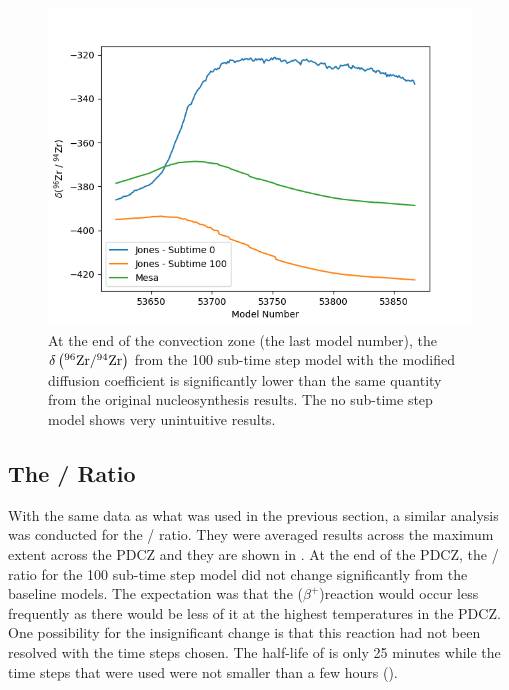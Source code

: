 \documentclass[fleqn,usenatbib]{mnras}
\begin{document}
\begin{figure}
   \includegraphics[width=1\columnwidth]{figs/JonesS1_zr.png}
   \caption{At the end of the convection zone (the last model number), the $\delta\left(\zirconium[96] / \zirconium[94]\right)$ from the 100 sub-time step model with the modified diffusion coefficient is significantly lower than the same quantity from the original nucleosynthesis results. The no sub-time step model shows very unintuitive results.}
\end{figure}

\subsection{The \xenon[128] / \xenon[130] Ratio}

With the same data as what was used in the previous section, a similar analysis was conducted for the \xenon[128] / \xenon[130] ratio. They were averaged results across the maximum extent across the PDCZ and they are shown in . At the end of the PDCZ, the \xenon[128] / \xenon[130] ratio for the 100 sub-time step model did not change significantly from the baseline models. The expectation was that the \iodine[128]($\beta^{+}$)\tellurium[128] reaction would occur less frequently as there would be less of it at the highest temperatures in the PDCZ. One possibility for the insignificant change is that this reaction had not been resolved with the time steps chosen. The half-life of \iodine[128] is only 25 minutes while the time steps that were used were not smaller than a few hours ().
\end{document}
